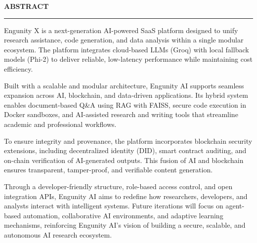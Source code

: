 \thispagestyle{empty}

\begin{center}
{\Large {\bf \uppercase{ABSTRACT}}}
\end{center}

\vspace{\baselineskip}
\hrule
\vspace{2\baselineskip}

Engunity X is a next-generation AI-powered SaaS platform designed to unify research assistance, code generation, and data analysis within a single modular ecosystem. The platform integrates cloud-based LLMs (Groq) with local fallback models (Phi-2) to deliver reliable, low-latency performance while maintaining cost efficiency.

Built with a scalable and modular architecture, Engunity AI supports seamless expansion across AI, blockchain, and data-driven applications. Its hybrid system enables document-based Q&A using RAG with FAISS, secure code execution in Docker sandboxes, and AI-assisted research and writing tools that streamline academic and professional workflows.

To ensure integrity and provenance, the platform incorporates blockchain security extensions, including decentralized identity (DID), smart contract auditing, and on-chain verification of AI-generated outputs. This fusion of AI and blockchain ensures transparent, tamper-proof, and verifiable content generation.

Through a developer-friendly structure, role-based access control, and open integration APIs, Engunity AI aims to redefine how researchers, developers, and analysts interact with intelligent systems. Future iterations will focus on agent-based automation, collaborative AI environments, and adaptive learning mechanisms, reinforcing Engunity AI’s vision of building a secure, scalable, and autonomous AI research ecosystem.
